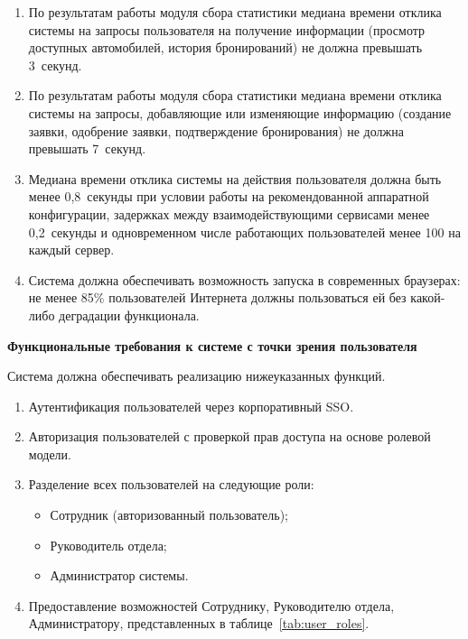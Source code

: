 \documentclass{bmstu}
\begin{document}
\begin{enumerate}
    \item По результатам работы модуля сбора статистики медиана времени отклика системы на запросы пользователя на получение информации (просмотр доступных автомобилей, история бронирований) не должна превышать 3~секунд.
    
    \item По результатам работы модуля сбора статистики медиана времени отклика системы на запросы, добавляющие или изменяющие информацию (создание заявки, одобрение заявки, подтверждение бронирования) не должна превышать 7~секунд.
    
    \item Медиана времени отклика системы на действия пользователя должна быть менее 0,8~секунды при условии работы на рекомендованной аппаратной конфигурации, задержках между взаимодействующими сервисами менее 0,2~секунды и одновременном числе работающих пользователей менее 100 на каждый сервер.
    
    \item Система должна обеспечивать возможность запуска в современных браузерах: не менее 85\% пользователей Интернета должны пользоваться ей без какой-либо деградации функционала.
\end{enumerate}

\begin{center}
    \textbf{Функциональные требования к системе с точки зрения пользователя}
\end{center}

Система должна обеспечивать реализацию нижеуказанных функций.

\begin{enumerate}
    \item Аутентификация пользователей через корпоративный SSO.
    
    \item Авторизация пользователей с проверкой прав доступа на основе ролевой модели.
    
    \item Разделение всех пользователей на следующие роли:
    \begin{itemize}
        \item Сотрудник (авторизованный пользователь);
        \item Руководитель отдела;
        \item Администратор системы.
    \end{itemize}
    
    \item Предоставление возможностей Сотруднику, Руководителю отдела, Администратору, представленных в таблице~\ref{tab:user_roles}.
\end{enumerate}
\end{document}
